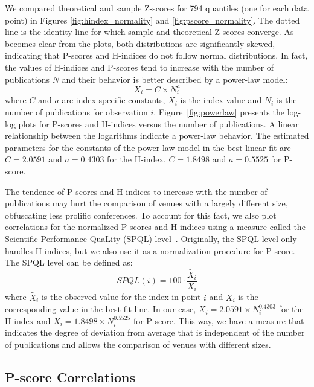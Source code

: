 \documentclass[notitlepage]{svjour3}
\begin{document}
We compared theoretical and sample Z-scores for 794 quantiles (one for each data point) in Figures
\ref{fig:hindex_normality} and \ref{fig:pscore_normality}. The dotted line is the identity line for
which sample and theoretical Z-scores converge. As becomes clear from the plots, both distributions
are significantly skewed, indicating that P-scores and H-indices do not follow normal distributions.
In fact, the values of H-indices and P-scores tend to increase with the number of publications $ N $ 
and their behavior is better described by a power-law model: 
%
\begin{equation}
X_i = C \times N_i^a
\end{equation}
%
where $ C $ and $ a $ are index-specific constants, $ X_i $ is the index value and $ N_i $ is the 
number of publications for observation $ i $. Figure~\ref{fig:powerlaw} presents the 
log-log plots for P-scores and H-indices versus the number of publications. A linear 
relationship between the logarithms indicate a power-law behavior. The estimated parameters
for the constants of the power-law model in the best linear fit are 
$ C = 2.0591 $ and $ a = 0.4303 $ for the H-index,
$ C = 1.8498 $ and $ a = 0.5525 $ for P-score.

The tendence of P-scores and H-indices to increase with the number of publications may hurt the comparison of venues 
with a largely different size, obfuscating less prolific conferences. To account for this fact, we also plot 
correlations for the normalized P-scores and H-indices using a measure called the Scientific Performance 
QuaLity (SPQL) level~\cite{Babic2016}.
Originally, the SPQL level only handles H-indices, but we also use it as a normalization procedure for
P-score. The SPQL level can be defined as:
%
\begin{equation}
SPQL(i) = 100 \cdot \frac{\tilde{X_i}}{X_i}
\end{equation}
%
where $ \tilde{X_i} $ is the observed value for the index in point $ i $ and $ X_i $ is the corresponding
value in the best fit line. In our case, 
$ X_i = 2.0591 \times N_i^{0.4303} $ for the H-index and 
$ X_i = 1.8498 \times N_i^{0.5525} $ for P-score.
This way, we have a measure that indicates
the degree of deviation from average that is independent of the number of publications and allows
the comparison of venues with different sizes.


\subsection{P-score Correlations}
\end{document}
